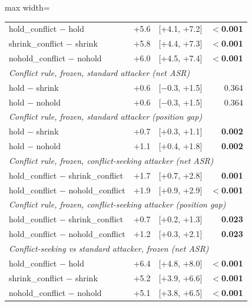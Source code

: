 \begin{table}[t]
\begin{adjustbox}{max width=\linewidth}
\begin{tabular}{lrrr}
hold\_conflict $-$ hold & +5.6 & [+4.1, +7.2] & \textbf{$<$0.001} \\
shrink\_conflict $-$ shrink & +5.8 & [+4.4, +7.3] & \textbf{$<$0.001} \\
nohold\_conflict $-$ nohold & +6.0 & [+4.5, +7.4] & \textbf{$<$0.001} \\
\midrule
\multicolumn{4}{l}{\textit{Conflict rule, frozen, standard attacker (net ASR)}} \\
hold $-$ shrink & +0.6 & [$-$0.3, +1.5] & 0.364 \\
hold $-$ nohold & +0.6 & [$-$0.3, +1.5] & 0.364 \\
\midrule
\multicolumn{4}{l}{\textit{Conflict rule, frozen, standard attacker (position gap)}} \\
hold $-$ shrink & +0.7 & [+0.3, +1.1] & \textbf{0.002} \\
hold $-$ nohold & +1.1 & [+0.4, +1.8] & \textbf{0.002} \\
\midrule
\multicolumn{4}{l}{\textit{Conflict rule, frozen, conflict-seeking attacker (net ASR)}} \\
hold\_conflict $-$ shrink\_conflict & +1.7 & [+0.7, +2.8] & \textbf{0.001} \\
hold\_conflict $-$ nohold\_conflict & +1.9 & [+0.9, +2.9] & \textbf{$<$0.001} \\
\midrule
\multicolumn{4}{l}{\textit{Conflict rule, frozen, conflict-seeking attacker (position gap)}} \\
hold\_conflict $-$ shrink\_conflict & +0.7 & [+0.2, +1.3] & \textbf{0.023} \\
hold\_conflict $-$ nohold\_conflict & +1.2 & [+0.3, +2.1] & \textbf{0.023} \\
\midrule
\multicolumn{4}{l}{\textit{Conflict-seeking vs standard attacker, frozen (net ASR)}} \\
hold\_conflict $-$ hold & +6.4 & [+4.8, +8.0] & \textbf{$<$0.001} \\
shrink\_conflict $-$ shrink & +5.2 & [+3.9, +6.6] & \textbf{$<$0.001} \\
nohold\_conflict $-$ nohold & +5.1 & [+3.8, +6.5] & \textbf{$<$0.001} \\
\bottomrule
\end{tabular}
\end{adjustbox}
\end{table}